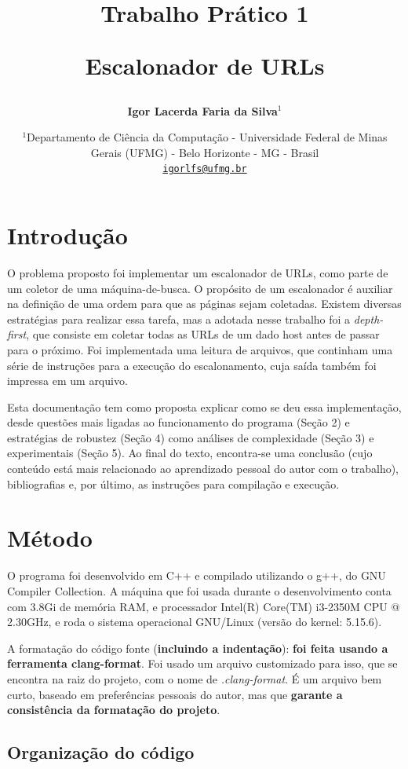 \documentclass{article}
\author{\textbf{Igor Lacerda Faria da Silva\( ^1 \)} }
\title{\textbf{Trabalho Prático 1}

\textbf{Escalonador de URLs}}
\date{%
    \( ^1 \)Departamento de Ciência da Computação - Universidade Federal de Minas Gerais (UFMG) - Belo Horizonte - MG - Brasil \\ [2ex]
    \href{mailto:igorlfs@ufmg.br}{\nolinkurl{igorlfs@ufmg.br}}
}
\begin{document}
\maketitle

\section{Introdução}

O problema proposto foi implementar um escalonador de URLs, como parte de um coletor de uma máquina-de-busca. O propósito de um escalonador é auxiliar na definição de uma ordem para que as páginas sejam coletadas. Existem diversas estratégias para realizar essa tarefa, mas a adotada nesse trabalho foi a \textit{depth-first}, que consiste em coletar todas as URLs de um dado host antes de passar para o próximo. Foi implementada uma leitura de arquivos, que continham uma série de instruções para a execução do escalonamento, cuja saída também foi impressa em um arquivo.

Esta documentação tem como proposta explicar como se deu essa implementação, desde questões mais ligadas ao funcionamento do programa (Seção 2) e estratégias de robustez (Seção 4) como análises de complexidade (Seção 3) e experimentais (Seção 5). Ao final do texto, encontra-se uma conclusão (cujo conteúdo está mais relacionado ao aprendizado pessoal do autor com o trabalho), bibliografias e, por último, as instruções para compilação e execução.

\section{Método}

O programa foi desenvolvido em C++ e compilado utilizando o g++, do GNU Compiler Collection. A máquina que foi usada durante o desenvolvimento conta com 3.8Gi de memória RAM, e processador Intel(R) Core(TM) i3-2350M CPU @ 2.30GHz, e roda o sistema operacional GNU/Linux (versão do kernel: 5.15.6).

A formatação do código fonte (\textbf{incluindo a indentação}): \textbf{foi feita usando a ferramenta clang-format}. Foi usado um arquivo customizado para isso, que se encontra na raiz do projeto, com o nome de \textit{.clang-format}. É um arquivo bem curto, baseado em preferências pessoais do autor, mas que \textbf{garante a consistência da formatação do projeto}.

\subsection{Organização do código}
\end{document}
